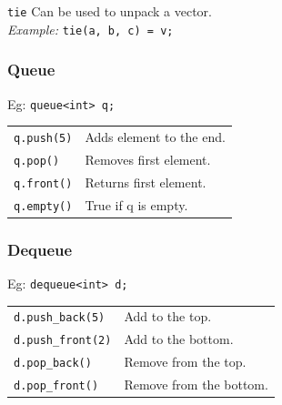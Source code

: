 \vspace*{8pt}
\texttt{tie} Can be used to unpack a vector.\\
\textit{Example:} \texttt{tie(a, b, c) = v;}\\


\vfill \null
\columnbreak


\subsubsection{Queue}
Eg: \texttt{queue<int> q;}\\

\begin{tabularx}{\linewidth}{lX}
\texttt{q.push(5)} & Adds element to the end.\\
\texttt{q.pop()} & Removes first element.\\
\texttt{q.front()} & Returns first element.\\
\texttt{q.empty()} & True if q is empty.\\
\end{tabularx}

\subsubsection{Dequeue}
Eg: \texttt{dequeue<int> d;}\\

\begin{tabularx}{\linewidth}{lX}
\texttt{d.push\_back(5)} & Add to the top.\\
\texttt{d.push\_front(2)} & Add to the bottom.\\
\texttt{d.pop\_back()} & Remove from the top.\\
\texttt{d.pop\_front()} & Remove from the bottom.\\
\end{tabularx}

